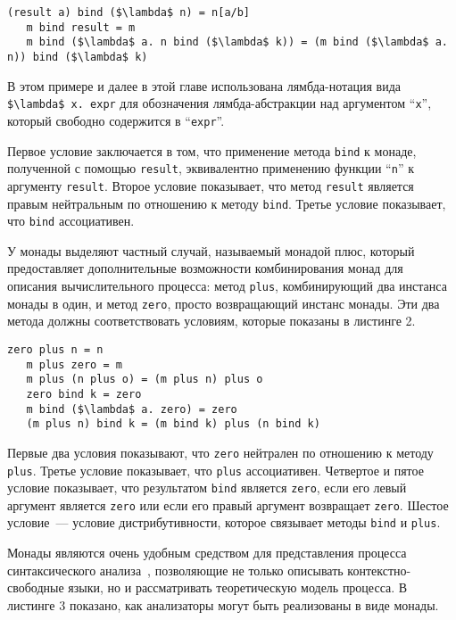 \begin{lstlisting}[basicstyle=\small, caption=Законы монады]
   (result a) bind ($\lambda$ n) = n[a/b]
   m bind result = m
   m bind ($\lambda$ a. n bind ($\lambda$ k)) = (m bind ($\lambda$ a. n)) bind ($\lambda$ k)
\end{lstlisting}

В этом примере и далее в этой главе использована лямбда-нотация вида \lstinline|$\lambda$ x. expr| для обозначения лямбда-абстракции над аргументом ``\lstinline|x|'', который свободно содержится в ``\lstinline|expr|''.

Первое условие заключается в том, что применение метода \lstinline|bind| к монаде, полученной с помощью \lstinline|result|, эквивалентно применению функции ``\lstinline|n|'' к аргументу \lstinline|result|. Второе условие показывает, что метод \lstinline|result| является правым нейтральным по отношению к методу \lstinline|bind|. Третье условие показывает, что \lstinline|bind| ассоциативен.

У монады выделяют частный случай, называемый монадой плюс, который предоставляет дополнительные возможности комбинирования монад для описания вычислительного процесса: метод \lstinline|plus|, комбинирующий два инстанса монады в один, и метод \lstinline|zero|, просто возвращающий инстанс монады. Эти два метода должны соответствовать условиям, которые показаны в листинге 2.

\begin{lstlisting}[basicstyle=\small, caption=Законы монады плюс]
   zero plus n = n
   m plus zero = m
   m plus (n plus o) = (m plus n) plus o
   zero bind k = zero
   m bind ($\lambda$ a. zero) = zero
   (m plus n) bind k = (m bind k) plus (n bind k)
\end{lstlisting}

Первые два условия показывают, что \lstinline|zero| нейтрален по отношению к методу \lstinline|plus|.
Третье условие показывает, что \lstinline|plus| ассоциативен.
Четвертое и пятое условие показывает, что результатом \lstinline|bind| является \lstinline|zero|, если его левый аргумент является \lstinline|zero| или если его правый аргумент возвращает \lstinline|zero|.
Шестое условие~--- условие дистрибутивности, которое связывает методы \lstinline|bind| и \lstinline|plus|.

Монады являются очень удобным средством для представления процесса синтаксического анализа~\cite{meijer}, позволяющие не только описывать контекстно-свободные языки, но и рассматривать теоретическую модель процесса. В листинге 3 показано, как анализаторы могут быть реализованы в виде монады.

